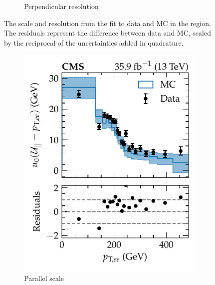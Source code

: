 \begin{figure}[htb]
\begin{subfigure}[b]{0.49\textwidth}
        \caption{Perpendicular resolution}
        \label{subfigd:recoil-calib-ptllbins-mm}
    \end{subfigure}
    \caption[Recoil scale and resolution in the dimuon final state.]{
        The \ptmiss scale and resolution from the fit to data and MC in the \dimuplusjets region. The residuals represent the difference between data and MC, scaled by the reciprocal of the uncertainties added in quadrature.
    }
    \label{fig:recoil-calib-ptllbins-mm}
\end{figure}
%
\begin{figure}[htb]
    \centering
    \begin{subfigure}[b]{0.49\textwidth}
        \centering
        \includegraphics{chapters/041_corrections/images/ptmiss_calib/metres_ee_u0_para.pdf}
        \caption{Parallel scale}
        \label{subfiga:recoil-calib-ptllbins-ee}
    \end{subfigure}
    \hfill
    \begin{subfigure}[b]{0.49\textwidth}
        \centering

\end{subfigure}
\end{figure}
